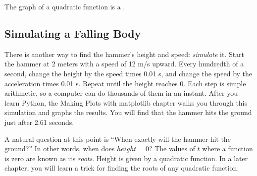 \hspace{4mm}

The graph of a quadratic function is a .

\subsection{Simulating a Falling Body}

There is another way to find the hammer's height and speed: \emph{simulate} it. Start the hammer at 2 meters
with a speed of 12 m/s upward. Every hundredth of a second, change the height by the speed times 0.01 s, and
change the speed by the acceleration times 0.01 s. Repeat until the height reaches 0. Each step is simple
arithmetic, so a computer can do thousands of them in an instant. After you learn Python, the Making Plots
with matplotlib chapter walks you through this simulation and graphs the results. You will find that the
hammer hits the ground just after 2.61 seconds.

A natural question at this point is ``When exactly will the hammer hit the
ground?''  In other words, when does $height = 0$? The values of $t$ where a 
function is zero are known as its \textit{roots}. Height is given by a quadratic 
function. In a later chapter, you will learn a trick for finding the roots of 
any quadratic function.
